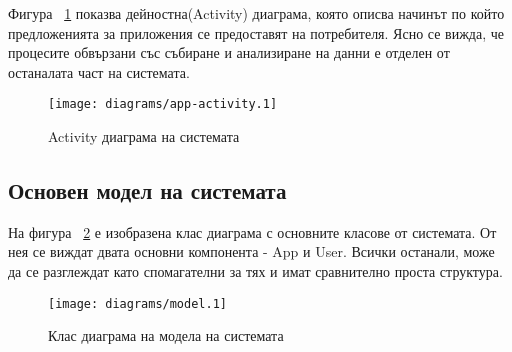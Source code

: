 	Фигура ~\ref{figure:app-activity} показва дейностна(Activity) диаграма, която описва начинът по който предложенията за приложения се предоставят на потребителя.
	Ясно се вижда, че процесите обвързани със събиране и анализиране на данни е отделен от останалата част на системата.
	
		\begin{figure}[htbp]
			\centering
 			\texttt{[image: diagrams/app-activity.1]}
			\caption{Activity диаграма на системата}
			\label{figure:app-activity}
		\end{figure}
	
	\subsection{Основен модел на системата}
	
		На фигура ~\ref{figure:model} е изобразена клас диаграма с основните класове от системата. От нея се виждат двата основни компонента - App и User. Всички останали, може да се разглеждат като спомагателни за тях и имат сравнително проста структура.
	
		\begin{figure}[htbp]
			\centering
 			\texttt{[image: diagrams/model.1]}
			\caption{Клас диаграма на модела на системата}
			\label{figure:model}
		\end{figure}